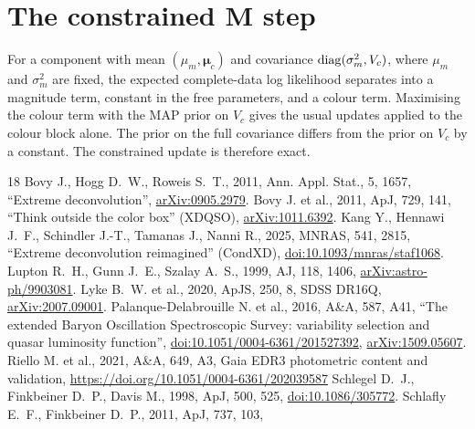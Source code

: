 \documentclass[11pt,a4paper]{article}
\newcommand{\vect}[1]{\boldsymbol{#1}}
\begin{document}
\section{The constrained M step}\label{app:mstep}
For a component with mean $(\mu_m,\vect{\mu}_c)$ and covariance ${\rm diag}(\sigma_m^2,V_c)$, where
$\mu_m$ and $\sigma_m^2$ are fixed, the expected complete-data log likelihood separates into a
magnitude term, constant in the free parameters, and a colour term. Maximising the colour term with
the MAP prior on $V_c$ gives the usual updates applied to the colour block alone. The prior on the full
covariance differs from the prior on $V_c$ by a constant. The constrained update is therefore exact.

\begin{thebibliography}{18}\small
{} Bovy J., Hogg D.~W., Roweis S.~T., 2011, Ann. Appl. Stat., 5, 1657,
  ``Extreme deconvolution'', \href{https://arxiv.org/abs/0905.2979}{arXiv:0905.2979}.
 Bovy J. et al., 2011, ApJ, 729, 141, ``Think outside the color box'' (XDQSO),
  \href{https://arxiv.org/abs/1011.6392}{arXiv:1011.6392}.
 Kang Y., Hennawi J.~F., Schindler J.-T., Tamanas J., Nanni R., 2025,
  MNRAS, 541, 2815, ``Extreme deconvolution reimagined'' (CondXD),
  \href{https://doi.org/10.1093/mnras/staf1068}{doi:10.1093/mnras/staf1068}.
 Lupton R.~H., Gunn J.~E., Szalay A.~S., 1999, AJ, 118, 1406,
  \href{https://arxiv.org/abs/astro-ph/9903081}{arXiv:astro-ph/9903081}.
 Lyke B.~W. et al., 2020, ApJS, 250, 8, SDSS DR16Q,
  \href{https://arxiv.org/abs/2007.09001}{arXiv:2007.09001}.
 Palanque-Delabrouille N. et al., 2016, A\&A, 587, A41,
  ``The extended Baryon Oscillation Spectroscopic Survey: variability selection and quasar luminosity function'',
  \href{https://doi.org/10.1051/0004-6361/201527392}{doi:10.1051/0004-6361/201527392},
  \href{https://arxiv.org/abs/1509.05607}{arXiv:1509.05607}.
 Riello M. et al., 2021, A\&A, 649, A3, Gaia EDR3 photometric content and validation,
  \url{https://doi.org/10.1051/0004-6361/202039587}
 Schlegel D.~J., Finkbeiner D.~P., Davis M., 1998, ApJ, 500, 525,
  \href{https://doi.org/10.1086/305772}{doi:10.1086/305772}.
 Schlafly E.~F., Finkbeiner D.~P., 2011, ApJ, 737, 103,

\end{thebibliography}
\end{document}

